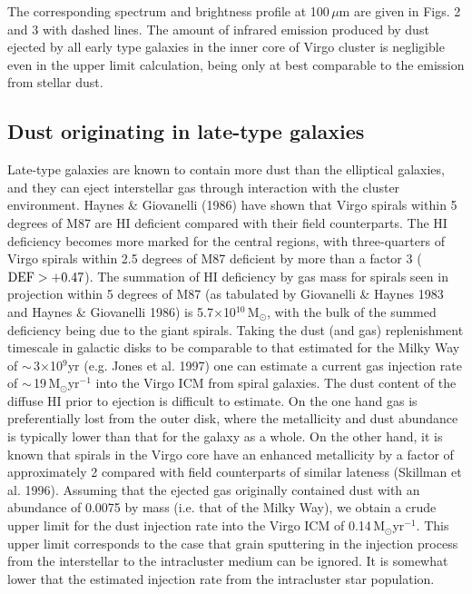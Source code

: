 \documentclass[]{aa}
\begin{document}
The corresponding spectrum and brightness profile at 100\,${\mu}$m are given in
Figs. 2 and 3 with dashed lines. The amount of infrared emission produced 
by dust ejected by all early type galaxies in the inner core of Virgo 
cluster is negligible even in the upper limit calculation, being only at best
comparable to the emission from stellar dust.

\subsection{Dust originating in late-type galaxies}

Late-type galaxies are known to contain more dust than the elliptical galaxies,
and they can eject interstellar gas through
interaction with the cluster environment.  
Haynes \& Giovanelli (1986) have 
shown that Virgo spirals within 5 degrees of M87 are HI deficient compared
with their field counterparts. The HI deficiency becomes more marked for the
central regions, with
three-quarters of Virgo spirals within 2.5 degrees of M87
deficient by more than a factor 3 (${\rm DEF}> +0.47$). The summation of
HI deficiency by gas mass for spirals seen in projection
within 5 degrees of M87 (as tabulated by Giovanelli \& Haynes 1983 and
Haynes \& Giovanelli 1986) is 5.7$\times$10$^{10}\,$M$_{\odot}$, with the
bulk of the summed deficiency being due to the giant spirals.
Taking the dust (and gas) replenishment timescale in galactic disks
to be comparable to that estimated for the Milky Way of 
$\sim\,$3$\times$10$^{9}$yr
(e.g. Jones et al. 1997) one can estimate a current gas injection rate of 
$\sim\,$19$\,$M$_{\odot}$yr$^{-1}$ into the Virgo ICM 
from spiral galaxies. The dust content of the 
diffuse HI prior to ejection is difficult to 
estimate. On the one hand gas is preferentially lost from the outer disk,
where the metallicity and dust abundance is typically lower than that for the
galaxy as a whole.
On the other hand, it is known that spirals in the Virgo core  
have an enhanced metallicity by a
factor of approximately 2 compared with
field counterparts of similar lateness (Skillman et al. 1996). Assuming
that the ejected gas originally contained dust with an abundance of
0.0075 by mass (i.e. that of the Milky Way), 
we obtain a crude upper limit for the dust injection rate into the Virgo ICM 
of 0.14$\,$M$_{\odot}$yr$^{-1}$. This upper limit corresponds
to the case that grain sputtering 
in the injection process from the interstellar to the intracluster medium
can be ignored. 
It is somewhat lower that the 
estimated injection rate from the intracluster star population.
\end{document}
